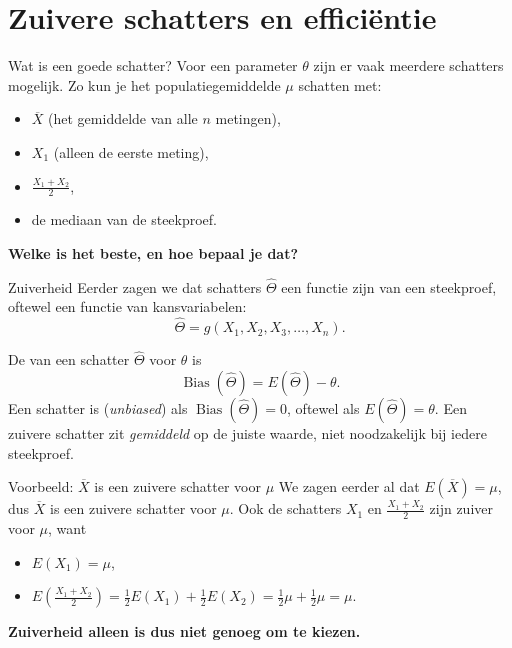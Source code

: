 \section{Zuivere schatters en efficiëntie}

    \begin{frame}{Wat is een goede schatter?}
        Voor een parameter $\theta$ zijn er vaak meerdere schatters mogelijk.
        \vfill
        Zo kun je het populatiegemiddelde $\mu$ schatten met:
        \begin{itemize}[<+->]
            \item $\overline{X}$ (het gemiddelde van alle $n$ metingen),
            \item $X_1$ (alleen de eerste meting),
            \item $\frac{X_1 + X_2}{2}$,
            \item de mediaan van de steekproef.
        \end{itemize}
        \vfill\pause
        \textbf{Welke is het beste, en hoe bepaal je dat?}
    \end{frame}

    \begin{frame}{Zuiverheid}
        Eerder zagen we dat schatters $\hat{\Theta}$ een functie zijn van een steekproef, oftewel een functie van kansvariabelen:
        \[
            \hat{\Theta} = g(X_1, X_2, X_3, \ldots, X_n).
        \] 

        De  van een schatter $\hat{\Theta}$ voor $\theta$ is
        \[
            \operatorname{Bias}(\hat{\Theta}) = E(\hat{\Theta}) - \theta.
        \]
        Een schatter is  (\emph{unbiased}) als $\operatorname{Bias}(\hat{\Theta}) = 0$, oftewel als
        $E(\hat{\Theta}) = \theta$.
        \vfill
        Een zuivere schatter zit \emph{gemiddeld} op de juiste waarde, niet noodzakelijk bij iedere steekproef.
    \end{frame}

    \begin{frame}{Voorbeeld: $\overline{X}$ is een zuivere schatter voor $\mu$}
        We zagen eerder al dat $E(\overline{X}) = \mu$, dus $\overline{X}$ is een zuivere schatter voor $\mu$.
        \vfill
        Ook de schatters $X_1$ en $\frac{X_1 + X_2}{2}$ zijn zuiver voor $\mu$, want
        \begin{itemize}[<+->]
            \item $E(X_1) = \mu$,
            \item $E\left(\frac{X_1 + X_2}{2}\right) = \frac{1}{2}E(X_1) + \frac{1}{2} E(X_2) = \frac{1}{2}\mu+\frac{1}{2}\mu= \mu$.
        \end{itemize}
        \vfill\pause
        \textbf{Zuiverheid alleen is dus niet genoeg om te kiezen.}
    \end{frame}


